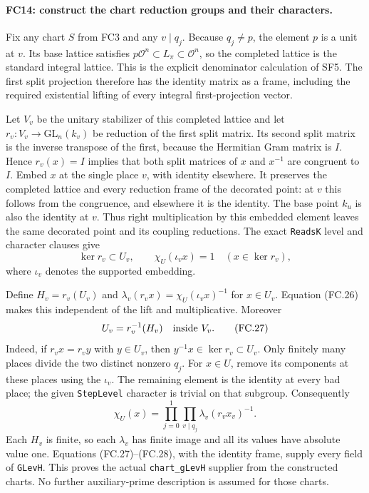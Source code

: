 \paragraph{FC14: construct the chart reduction groups and their
characters.}
Fix any chart $S$ from FC3 and any $v\mid q_j$.
Because $q_j\ne p$, the element $p$ is a unit at $v$. Its base
lattice satisfies
$p\mathcal O^n\subset L_\pi\subset\mathcal O^n$, so the
completed lattice is the standard integral lattice. This is the explicit
denominator calculation of SF5. The first split projection therefore has
the identity matrix as a frame, including the required existential
lifting of every integral first-projection vector.

Let $V_v$ be the unitary stabilizer of this completed lattice and let
$r_v:V_v\to\mathrm{GL}_n(k_v)$ be reduction of the first split
matrix. Its second split matrix is the inverse transpose of the first,
because the Hermitian Gram matrix is $I$. Hence $r_v(x)=I$ implies
that both split matrices of $x$ and $x^{-1}$ are congruent to $I$.
Embed $x$ at the single place $v$, with identity elsewhere. It preserves
the completed lattice and every reduction frame of the decorated point:
at $v$ this follows from the congruence, and elsewhere it is the identity.
The base point $k_u$ is also the identity at $v$.
Thus right multiplication by this embedded element leaves the same
decorated point and its coupling reductions. The exact \texttt{ReadsK}
level and character clauses give
\[
 \ker r_v\subset U_v,\qquad
 \chi_U(\iota_v x)=1\quad(x\in\ker r_v),             \tag{FC.26}
\]
where $\iota_v$ denotes the supported embedding.

Define $H_v=r_v(U_v)$ and
$\lambda_v(r_vx)=\chi_U(\iota_vx)^{-1}$ for $x\in U_v$.
Equation (FC.26) makes this independent of the lift and multiplicative.
Moreover
\[
 U_v=r_v^{-1}(H_v)\quad\hbox{inside }V_v.             \tag{FC.27}
\]
Indeed, if $r_vx=r_vy$ with $y\in U_v$, then
$y^{-1}x\in\ker r_v\subset U_v$.
Only finitely many places divide the two distinct nonzero $q_j$.
For $x\in U$, remove its components at these places using the
$\iota_v$. The remaining element is the identity at every bad place;
the given \texttt{StepLevel} character is trivial on that subgroup.
Consequently
\[
 \chi_U(x)=\prod_{j=0}^1\prod_{v\mid q_j}
                  \lambda_v(r_vx_v)^{-1}.            \tag{FC.28}
\]
Each $H_v$ is finite, so each $\lambda_v$ has finite image and all
its values have absolute value one. Equations (FC.27)--(FC.28), with
the identity frame, supply every field of \texttt{GLevH}.
This proves the actual \texttt{chart\_gLevH} supplier from the
constructed charts. No further auxiliary-prime description is assumed
for those charts.


